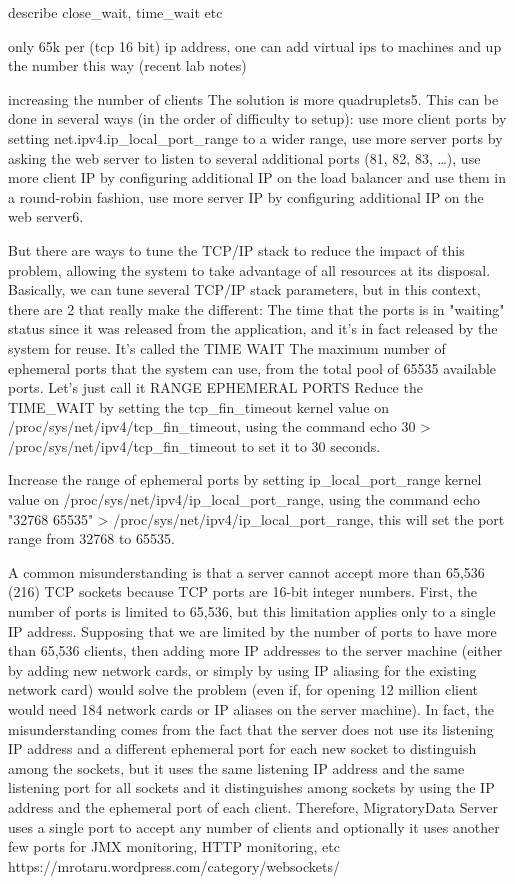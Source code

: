 \documentclass{uvamscse}
\begin{document}
describe close\_wait, time\_wait etc

only 65k per (tcp 16 bit) ip address, one can add virtual ips to machines and up the number this way
(recent lab notes)

increasing the number of clients
The solution is more quadruplets5. This can be done in several ways (in the order of difficulty to setup):
use more client ports by setting net.ipv4.ip\_local\_port\_range to a wider range,
use more server ports by asking the web server to listen to several additional ports (81, 82, 83, …),
use more client IP by configuring additional IP on the load balancer and use them in a round-robin fashion,
use more server IP by configuring additional IP on the web server6.

But there are ways to tune the TCP/IP stack to reduce the impact of this problem, allowing the system to take advantage of all resources at its disposal. Basically, we can tune several TCP/IP stack parameters, but in this context, there are 2 that really make the different:
The time that the ports is in "waiting" status since it was released from the application, and it's in fact released by the system for reuse. It's called the TIME WAIT
The maximum number of ephemeral ports that the system can use, from the total pool of 65535 available ports. Let's just call it RANGE EPHEMERAL PORTS
Reduce the TIME\_WAIT by setting the tcp\_fin\_timeout kernel value on /proc/sys/net/ipv4/tcp\_fin\_timeout, using the command echo 30 > /proc/sys/net/ipv4/tcp\_fin\_timeout to set it to 30 seconds.

Increase the range of ephemeral ports by setting ip\_local\_port\_range kernel value on /proc/sys/net/ipv4/ip\_local\_port\_range, using the command echo "32768 65535" > /proc/sys/net/ipv4/ip\_local\_port\_range, this will set the port range from 32768 to 65535.

A common misunderstanding is that a server cannot accept more than 65,536 (216) TCP sockets because TCP ports are 16-bit integer numbers.
First, the number of ports is limited to 65,536, but this limitation applies only to a single IP address. Supposing that we are limited by the number of ports to have more than 65,536 clients, then adding more IP addresses to the server machine (either by adding new network cards, or simply by using IP aliasing for the existing network card) would solve the problem (even if, for opening 12 million client would need 184 network cards or IP aliases on the server machine).
In fact, the misunderstanding comes from the fact that the server does not use its listening IP address and a different ephemeral port for each new socket to distinguish among the sockets, but it uses the same listening IP address and the same listening port for all sockets and it distinguishes among sockets by using the IP address and the ephemeral port of each client. Therefore, MigratoryData Server uses a single port to accept any number of clients and optionally it uses another few ports for JMX monitoring, HTTP monitoring, etc
https://mrotaru.wordpress.com/category/websockets/
\end{document}
